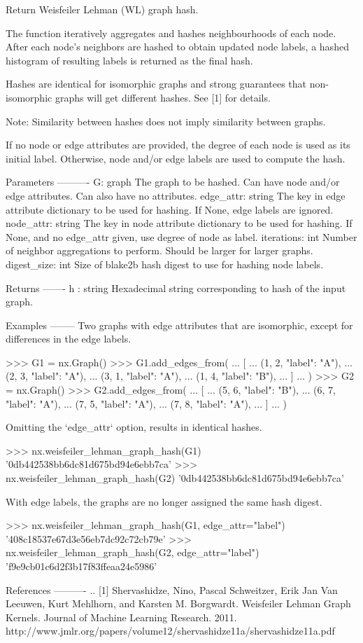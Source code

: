 \begin{DoxyVerb}Return Weisfeiler Lehman (WL) graph hash.

The function iteratively aggregates and hashes neighbourhoods of each node.
After each node's neighbors are hashed to obtain updated node labels,
a hashed histogram of resulting labels is returned as the final hash.

Hashes are identical for isomorphic graphs and strong guarantees that
non-isomorphic graphs will get different hashes. See [1] for details.

Note: Similarity between hashes does not imply similarity between graphs.

If no node or edge attributes are provided, the degree of each node
is used as its initial label.
Otherwise, node and/or edge labels are used to compute the hash.

Parameters
----------
G: graph
    The graph to be hashed.
    Can have node and/or edge attributes. Can also have no attributes.
edge_attr: string
    The key in edge attribute dictionary to be used for hashing.
    If None, edge labels are ignored.
node_attr: string
    The key in node attribute dictionary to be used for hashing.
    If None, and no edge_attr given, use
    degree of node as label.
iterations: int
    Number of neighbor aggregations to perform.
    Should be larger for larger graphs.
digest_size: int
    Size of blake2b hash digest to use for hashing node labels.

Returns
-------
h : string
    Hexadecimal string corresponding to hash of the input graph.

Examples
--------
Two graphs with edge attributes that are isomorphic, except for
differences in the edge labels.

>>> G1 = nx.Graph()
>>> G1.add_edges_from(
...     [
...         (1, 2, {"label": "A"}),
...         (2, 3, {"label": "A"}),
...         (3, 1, {"label": "A"}),
...         (1, 4, {"label": "B"}),
...     ]
... )
>>> G2 = nx.Graph()
>>> G2.add_edges_from(
...     [
...         (5, 6, {"label": "B"}),
...         (6, 7, {"label": "A"}),
...         (7, 5, {"label": "A"}),
...         (7, 8, {"label": "A"}),
...     ]
... )

Omitting the `edge_attr` option, results in identical hashes.

>>> nx.weisfeiler_lehman_graph_hash(G1)
'0db442538bb6dc81d675bd94e6ebb7ca'
>>> nx.weisfeiler_lehman_graph_hash(G2)
'0db442538bb6dc81d675bd94e6ebb7ca'

With edge labels, the graphs are no longer assigned
the same hash digest.

>>> nx.weisfeiler_lehman_graph_hash(G1, edge_attr="label")
'408c18537e67d3e56eb7dc92c72cb79e'
>>> nx.weisfeiler_lehman_graph_hash(G2, edge_attr="label")
'f9e9cb01c6d2f3b17f83ffeaa24e5986'

References
----------
.. [1] Shervashidze, Nino, Pascal Schweitzer, Erik Jan Van Leeuwen,
   Kurt Mehlhorn, and Karsten M. Borgwardt. Weisfeiler Lehman
   Graph Kernels. Journal of Machine Learning Research. 2011.
   http://www.jmlr.org/papers/volume12/shervashidze11a/shervashidze11a.pdf
\end{DoxyVerb}
 